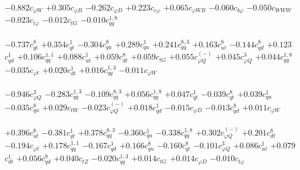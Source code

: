 \documentclass{article}
\begin{document}
{$-0.882$}{\rm $c_{\varphi W}$} 
{$+0.305$}{\rm $c_{\varphi B}$} 
{$-0.262$}{\rm $c_{\varphi D}$} 
{$+0.223$}{\rm $c_{c \varphi}$} 
{$+0.065$}{\rm $c_{\varphi WB}$} 
{$-0.060$}{\rm $c_{b \varphi}$} 
{$-0.050$}{\rm $c_{WWW}$} 
{$-0.023$}{\rm $c_{t \varphi}$} 
{$-0.012$}{\rm $c_{tG}$} 
{$-0.010$}{\rm $c_{qq}^{1,8}$} 
 \nonumber \\ \nonumber \\ 
{$-0.737$}{\rm $c_{qt}^{8}$} 
{$+0.354$}{\rm $c_{qt}^{1}$} 
{$-0.304$}{\rm $c_{qu}^{8}$} 
{$+0.289$}{\rm $c_{qu}^{1}$} 
{$+0.241$}{\rm $c_{qq}^{8,3}$} 
{$+0.163$}{\rm $c_{ut}^{8}$} 
{$-0.144$}{\rm $c_{qd}^{8}$} 
{$+0.123$}{\rm $c_{qd}^{1}$} 
{$+0.106$}{\rm $c_{qq}^{1,1}$} 
{$+0.088$}{\rm $c_{ut}^{1}$} 
{$+0.059$}{\rm $c_{dt}^{8}$} 
{$+0.059$}{\rm $c_{tG}$} 
{$+0.055$}{\rm $c_{\varphi Q}^{(-)}$} 
{$+0.045$}{\rm $c_{\varphi Q}^{3}$} 
{$+0.044$}{\rm $c_{qq}^{1,8}$} 
{$-0.035$}{\rm $c_{\varphi t}$} 
{$+0.020$}{\rm $c_{dt}^{1}$} 
{$+0.016$}{\rm $c_{qq}^{1,3}$} 
{$-0.011$}{\rm $c_{\varphi W}$} 
 \nonumber \\ \nonumber \\ 
{$-0.946$}{\rm $c_{\varphi Q}^{3}$} 
{$-0.283$}{\rm $c_{qq}^{1,3}$} 
{$-0.109$}{\rm $c_{qq}^{8,3}$} 
{$+0.056$}{\rm $c_{qq}^{1,8}$} 
{$+0.047$}{\rm $c_{qt}^{1}$} 
{$-0.039$}{\rm $c_{qt}^{8}$} 
{$+0.039$}{\rm $c_{qu}^{1}$} 
{$-0.035$}{\rm $c_{qu}^{8}$} 
{$+0.029$}{\rm $c_{tW}$} 
{$-0.023$}{\rm $c_{\varphi Q}^{(-)}$} 
{$+0.018$}{\rm $c_{qd}^{1}$} 
{$-0.015$}{\rm $c_{\varphi D}$} 
{$-0.013$}{\rm $c_{qd}^{8}$} 
{$+0.011$}{\rm $c_{\varphi W}$} 
 \nonumber \\ \nonumber \\ 
{$+0.396$}{\rm $c_{ut}^{8}$} 
{$-0.381$}{\rm $c_{qt}^{1}$} 
{$+0.378$}{\rm $c_{qq}^{8,3}$} 
{$-0.360$}{\rm $c_{qu}^{1}$} 
{$-0.338$}{\rm $c_{qq}^{1,8}$} 
{$+0.302$}{\rm $c_{\varphi Q}^{(-)}$} 
{$+0.201$}{\rm $c_{dt}^{8}$} 
{$-0.194$}{\rm $c_{\varphi t}$} 
{$+0.178$}{\rm $c_{qq}^{1,1}$} 
{$-0.167$}{\rm $c_{qd}^{1}$} 
{$+0.166$}{\rm $c_{qu}^{8}$} 
{$-0.160$}{\rm $c_{qt}^{8}$} 
{$-0.101$}{\rm $c_{\varphi Q}^{3}$} 
{$+0.086$}{\rm $c_{ut}^{1}$} 
{$+0.079$}{\rm $c_{dt}^{1}$} 
{$+0.056$}{\rm $c_{qd}^{8}$} 
{$+0.040$}{\rm $c_{tZ}$} 
{$-0.020$}{\rm $c_{qq}^{1,3}$} 
{$+0.014$}{\rm $c_{tG}$} 
{$+0.014$}{\rm $c_{\varphi D}$} 
{$-0.010$}{\rm $c_{t \varphi}$} 
 \nonumber \\ \nonumber \\ 
\end{document}
